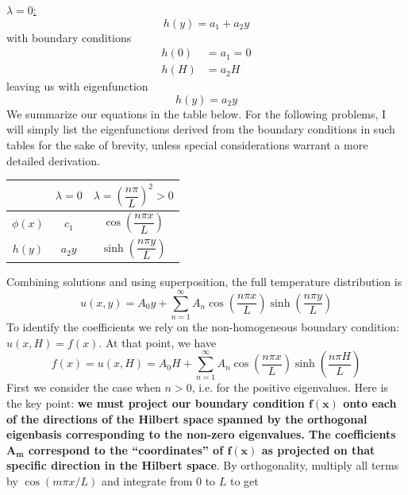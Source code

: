 \documentclass[a4paper]{article}
\begin{document}
\begin{enumerate}[label=(\alph*)]
	\underline{\( \lambda = 0 \):}
	\[
		h \!\left( y \right) = a_{1} + a_{2}y 
	\]
	with boundary conditions
	\begin{align*}
		h \!\left( 0 \right) & = a_{1} = 0 \\
		h \!\left( H \right) & = a_{2}H
	\end{align*}
	leaving us with eigenfunction
	\[
		h \!\left( y \right) = a_{2}y 
	\]
	We summarize our equations in the table below. For the following problems, I will simply list the eigenfunctions derived from the boundary conditions in such tables for the sake of brevity, unless special considerations warrant a more detailed derivation.
	\begin{center}
		\renewcommand{\arraystretch}{1.8}
		\setlength{\arraycolsep}{10pt}
		\begin{tabular}{|c||c|c|}
			\hline
			\rule[-1.2em]{0pt}{3em}
			 & \( \lambda = 0 \) & \( \lambda = \left( \dfrac{n \pi}{L} \right)^{2} > 0 \) \\
			\hline\hline
			\rule[-1.2em]{0pt}{3em}
			\( \phi(x) \) & \( c_{1} \) & \( \cos\!\left(\dfrac{n \pi x}{L}\right) \) \\
			\hline
			\rule[-1.2em]{0pt}{3em}
			\( h(y) \) & \( a_{2}y \) & \( \sinh\!\left(\dfrac{n \pi y}{L}\right) \) \\
			\hline
		\end{tabular}
	\end{center}
	Combining solutions and using superposition, the full temperature distribution is
	\[
		u \!\left( x,y \right) = A_{0}y + \sum^{\infty}_{n=1} A_{n}\cos\!\left(\frac{n \pi x}{L}\right)\sinh\!\left(\frac{n \pi y}{L}\right) 
	\]
	To identify the coefficients we rely on the non-homogeneous boundary condition: \( u \!\left( x,H \right) = f \!\left( x \right) \). At that point, we have
	\[
		f \!\left( x \right) = u \!\left( x,H \right) = A_{0}H + \sum^{\infty}_{n=1} A_{n}\cos\!\left(\frac{n \pi x}{L}\right)\sinh\!\left(\frac{n \pi H}{L}\right) 
	\]
	First we consider the case when \( n > 0 \), i.e. for the positive eigenvalues. Here is the key point: \textbf{we must project our boundary condition \( \pmb{f \!\left( x \right)} \) onto each of the directions of the Hilbert space spanned by the orthogonal eigenbasis corresponding to the non-zero eigenvalues. The coefficients \( \pmb{A_{m}} \) correspond to the ``coordinates'' of \( \pmb{f \!\left( x \right)} \) as projected on that specific direction in the Hilbert space}. By orthogonality, multiply all terms by \( \cos\!\left(m \pi x / L\right) \) and integrate from \( 0 \) to \( L \) to get

\end{enumerate}
\end{document}
